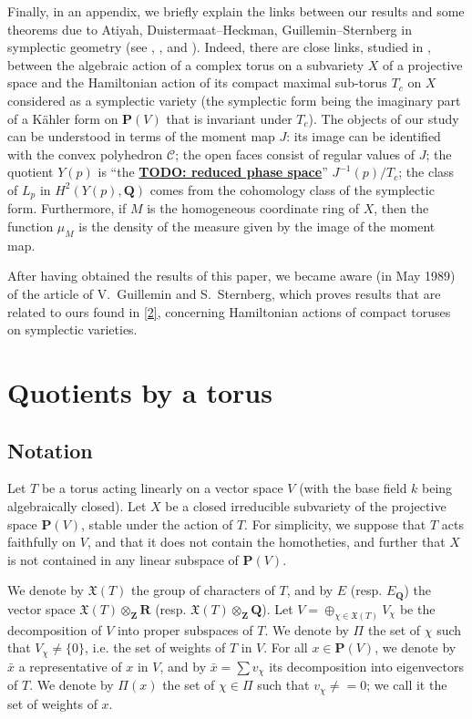 \documentclass{article}
\theoremstyle{plain}
\theoremstyle{definition}
\newcommand{\PP}{\mathbf{P}}
\newcommand{\QQ}{\mathbf{Q}}
\newcommand{\ZZ}{\mathbf{Z}}
\newcommand{\RR}{\mathbf{R}}
\newcommand{\unsure}[1]{\underline{\textbf{TODO: #1}}}
\newcommand{\oldpage}[1]{\marginpar{\footnotesize$\Big\vert$ \textit{p.~#1}}}
\begin{document}
Finally, in an appendix, we briefly explain the links between our results and some theorems due to Atiyah, Duistermaat--Heckman, Guillemin--Sternberg in symplectic geometry (see \cite{Ati}, \cite{DH12}, and \cite{GS12}).
Indeed, there are close links, studied in \cite{Kir}, between the algebraic action of a complex torus on a subvariety $X$ of a projective space and the Hamiltonian action of its compact maximal sub-torus $T_c$ on $X$ considered as a symplectic variety (the symplectic form being the imaginary part of a K\"{a}hler form on $\PP(V)$ that is invariant under $T_c$).
The objects of our study can be understood in terms of the moment map $J$:
its image can be identified with the convex polyhedron $\mathcal{C}$;
the open faces consist of regular values of $J$;
the quotient $Y(p)$ is ``the \unsure{reduced phase space}'' $J^{-1}(p)/T_c$;
the class of $L_p$ in $H^2(Y(p),\QQ)$ comes from the cohomology class of the symplectic form.
Furthermore, if $M$ is the homogeneous coordinate ring of $X$, then the function $\mu_M$ is the density of the measure given by the image of the moment map.

After having obtained the results of this paper, we became aware (in May 1989) of the article \cite{GS3} of V.~Guillemin and S.~Sternberg, which proves results that are related to ours found in \cref{2}, concerning Hamiltonian actions of compact toruses on symplectic varieties.


\section{Quotients by a torus}
\label{1}

\subsection{Notation}
\label{1.1}

Let $T$ be a torus acting linearly on a vector space $V$ (with the base field $k$ being algebraically closed).
Let $X$ be a closed irreducible subvariety of the projective space $\PP(V)$, stable under the action of $T$.
For simplicity, we suppose
\oldpage{512}
that $T$ acts faithfully on $V$, and that it does not contain the homotheties, and further that $X$ is not contained in any linear subspace of $\PP(V)$.

We denote by $\mathfrak{X}(T)$ the group of characters of $T$, and by $E$ (resp. $E_\QQ$) the vector space $\mathfrak{X}(T)\otimes_\ZZ\RR$ (resp. $\mathfrak{X}(T)\otimes_\ZZ\QQ$).
Let $V=\oplus_{\chi\in\mathfrak{X}(T)}V_\chi$ be the decomposition of $V$ into proper subspaces of $T$.
We denote by $\Pi$ the set of $\chi$ such that $V_\chi\neq\{0\}$, i.e. the set of weights of $T$ in $V$.
For all $x\in\PP(V)$, we denote by $\bar{x}$ a representative of $x$ in $V$, and by $\bar{x}=\sum v_\chi$ its decomposition into eigenvectors of $T$.
We denote by $\Pi(x)$ the set of $\chi\in\Pi$ such that $v_\chi\neq=0$;
we call it the set of weights of $x$.
\end{document}
